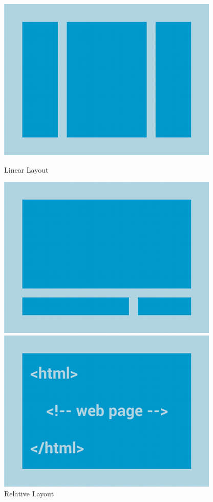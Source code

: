 \begin{figure}[H]
\centering
{}
  \includegraphics[width=\linewidth]{02-layouts/linearlayout.png}
  \caption{Linear Layout}
\endminipage\hspace{1cm}
  \includegraphics[width=\linewidth]{02-layouts/relativelayout.png}
  \caption{Relative Layout}
\endminipage\hspace{1cm}
%
  \includegraphics[width=\linewidth]{02-layouts/webview.png}

\end{figure}
